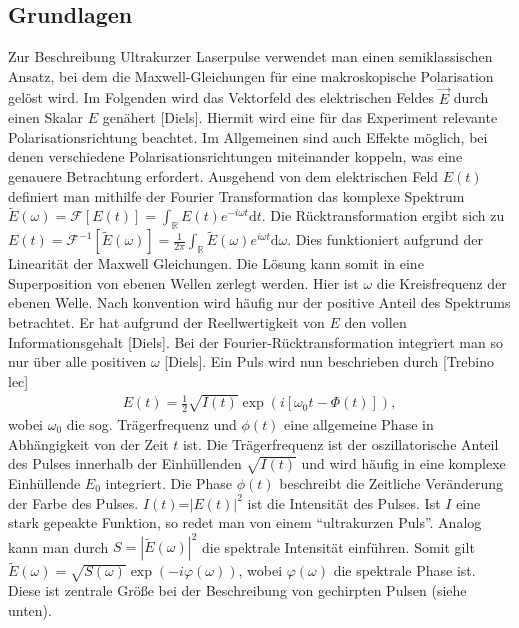 \documentclass[twoside,        %
               BCOR12mm,       %
               english,ngerman, %
               fleqn,headsepline=false,footsepline=false
              ]{Vorlage/MFPREPORT}
\renewcommand{\d}{\ensuremath{\mathrm{d}}} %
\begin{document}
\subsection{Grundlagen}
Zur Beschreibung Ultrakurzer Laserpulse verwendet man einen semiklassischen
Ansatz, bei dem die Maxwell-Gleichungen für eine makroskopische Polarisation
gelöst wird. Im Folgenden wird das Vektorfeld des elektrischen Feldes $\vec E$
durch einen Skalar $E$ genähert [Diels]. Hiermit wird eine für das Experiment
relevante Polarisationsrichtung beachtet. Im Allgemeinen sind auch Effekte
möglich, bei denen verschiedene Polarisationsrichtungen miteinander koppeln,
was eine genauere Betrachtung erfordert.
Ausgehend von dem elektrischen Feld $E(t)$ definiert man mithilfe der Fourier
Transformation das komplexe Spektrum
$\tilde{E}(\omega)=\mathcal{F}[E(t)]=\int_\mathbb{R}E(t)e^{-i\omega t}\d t
\label{eq:FT}$.
Die Rücktransformation ergibt sich zu $E(t)=\mathcal{F}^{-1}[\tilde
E(\omega)]=\frac{1}{2\pi}\int_{\mathbb R}\tilde E(\omega)e^{i\omega t}\d
\omega$. Dies funktioniert aufgrund der Linearität der Maxwell Gleichungen. Die
Lösung kann somit in eine Superposition von ebenen Wellen zerlegt werden. Hier
ist $\omega$ die Kreisfrequenz der ebenen Welle. Nach konvention wird häufig
nur der positive Anteil des Spektrums betrachtet. Er hat aufgrund der
Reellwertigkeit von $E$ den vollen Informationsgehalt
[Diels]. Bei der Fourier-Rücktransformation integriert man so nur über alle
positiven $\omega$ [Diels].
Ein Puls wird nun beschrieben durch [Trebino lec]
\begin{align}
    E(t)=\frac{1}{2}\sqrt{I(t)}\exp\left(i\left[ \omega _0 t-\Phi(t)
    \right]\right),
    \label{eq:efield}
\end{align}
wobei $\omega_0$ die sog. Trägerfrequenz und $\phi(t)$ eine allgemeine Phase in
Abhängigkeit von der Zeit $t$ ist. Die Trägerfrequenz ist der oszillatorische
Anteil des Pulses innerhalb der Einhüllenden $\sqrt{I(t)}$ und wird häufig in
eine komplexe Einhüllende $E_0$ integriert. Die Phase $\phi(t)$ beschreibt die
Zeitliche Veränderung der Farbe des Pulses. $I(t)$=$|E(t)|^2$ ist die
Intensität des Pulses. Ist $I$ eine stark gepeakte Funktion, so redet man von
einem ``ultrakurzen Puls''. Analog kann man durch $S=|\tilde E(\omega)|^2$ die
spektrale Intensität einführen. Somit gilt $\tilde
E(\omega)=\sqrt{S(\omega)}\exp(-i\varphi(\omega))\label{eq:spectrum}$, wobei
$\varphi(\omega)$ die spektrale Phase ist. Diese ist zentrale Größe bei der 
Beschreibung von gechirpten Pulsen (siehe unten).
\end{document}

